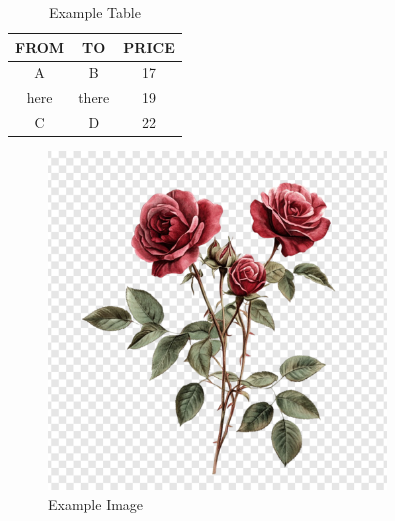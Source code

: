 \documentclass{article}
\begin{document}
\begin{table}[h]
    \centering
    \renewcommand{\arraystretch}{1.2}
    \begin{tabular}{|c|c|c|}
        \hline
        \textbf{FROM} & \textbf{TO} & \textbf{PRICE} \\ 
        \hline
        A & B & 17 \\ 
        \hline
        here & there & 19 \\ 
        \hline
        C & D & 22 \\ 
        \hline
    \end{tabular}
    \caption{Example Table}
    \label{tab:example}
\end{table}

\begin{figure}[h]
    \centering
    \includegraphics[width=0.8\textwidth]{example_image.jpg}
    \caption{Example Image}
    \label{fig:example}
\end{figure}
\end{document}
